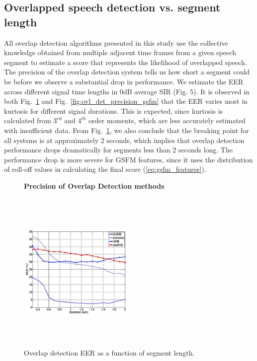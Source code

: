 {\subsection{Overlapped speech detection vs. segment length}
\label{sssec:ovl_frame_vs_seg_gsfm}
All overlap detection algorithms presented in this study use the collective knowledge obtained from multiple adjacent time frames from a given speech segment to estimate a score that represents the likelihood of overlapped speech. 
The precision of the overlap detection system tells us how short a segment could be before we observe a substantial drop in performance. 
We estimate the EER across different signal time lengths in 0dB average SIR (Fig. 5). It is observed in both Fig.~\ref{fig:ovl_det_precision} and Fig.~\ref{fig:ovl_det_precision_gsfm} that the EER varies most in kurtosis for different signal durations. 
This is expected, since kurtosis is calculated from $3^{rd}$ and $4^{th}$ order moments, which are less accurately estimated with insufficient data. 
From Fig.~\ref{fig:ovl_det_precision}, we also conclude that the breaking point for all systems is at approximately 2 seconds, which implies that overlap detection performance drops dramatically for segments less than 2 seconds long. 
The performance drop is more severe for GSFM features, since it uses the distribution of roll-off values in calculating the final score (\ref{eq:gsfm_features}). 

\begin{figure}[h!]
	\centering
	\hspace{-1mm}
	\textbf{Precision of Overlap Detection methods}\par\medskip
	\includegraphics[height = 3.1in, width=0.5\textwidth]{figures/eer_vs_time_gsfm}
	\vspace{-1mm}
	\caption{Overlap detection EER as a function of segment length. }
	\vspace{0mm}
	\label{fig:ovl_det_precision}
\end{figure}


}
